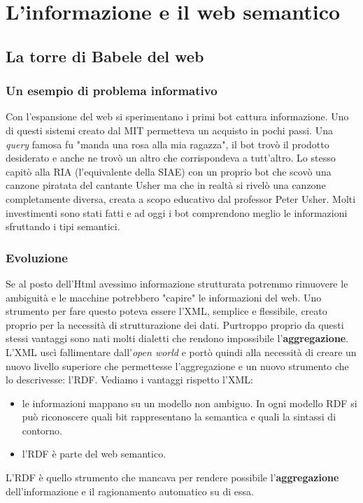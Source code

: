 
\chapter{L'informazione e il web semantico}

	\section{La torre di Babele del web}
	
		\subsection{Un esempio di problema informativo}
			Con l'espansione del web si sperimentano i primi bot cattura informazione. Uno di questi sistemi creato dal MIT permetteva un acquisto in pochi passi. Una \emph{query} famosa fu "manda una rosa alla mia ragazza", il bot trovò il prodotto desiderato e anche ne trovò un altro che corrispondeva a tutt'altro.
			Lo stesso capitò alla RIA (l'equivalente della SIAE) con un proprio bot che scovò una canzone piratata del cantante Usher ma che in realtà si rivelò una canzone completamente diversa, creata a scopo educativo dal professor Peter Usher.
			Molti investimenti sono stati fatti e ad oggi i bot comprendono meglio le informazioni sfruttando i tipi semantici.
		
		\subsection{Evoluzione}
			Se al posto dell'Html avessimo informazione strutturata potremmo rimuovere le  ambiguità e le macchine potrebbero "capire" le informazioni del web. Uno strumento per fare questo poteva essere l'XML, semplice e flessibile, creato proprio per la necessità di strutturazione dei dati. Purtroppo proprio da questi stessi vantaggi sono nati molti dialetti che rendono impossibile l'\textbf{aggregazione}. L'XML uscì fallimentare dall'\emph{open world} e portò quindi alla necessità di creare un nuovo livello superiore che permettesse l'aggregazione e un nuovo strumento che lo descrivesse: l'RDF. Vediamo i vantaggi rispetto l'XML:
			\begin{itemize}
				\item le informazioni mappano su un modello non ambiguo. In ogni modello RDF si può riconoscere quali bit rappresentano la semantica e quali la sintassi di contorno.
				\item l'RDF è parte del web semantico.
			\end{itemize}
			L'RDF è quello strumento che mancava per rendere possibile l'\textbf{aggregazione} dell'informazione e il ragionamento automatico su di essa.
		
